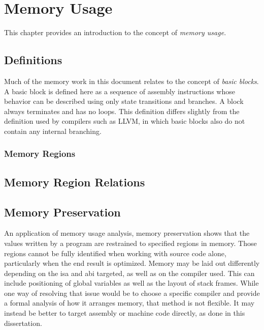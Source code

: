 \chapter{Memory Usage}\label{ch:memory}
This chapter provides an introduction to the concept of \emph{memory usage}.%


\section{Definitions}
Much of the memory work in this document relates to the concept of
\emph{basic blocks}.
A basic block is defined here as a sequence of assembly instructions
whose behavior can be described using only state transitions and branches.
A block always terminates and has no loops.
This definition differs slightly from the definition used by compilers such as LLVM,
in which basic blocks also do not contain any internal branching.

\subsection{Memory Regions}\label{memory_regions}
%



\section{Memory Region Relations}\label{mem_reg_rel}
%

\section{Memory Preservation}\label{se:memory_preservation}
An application of memory usage analysis,
memory preservation shows that the values written by a program%
are restrained to specified regions in memory.
Those regions cannot be fully identified when working with source code alone,
particularly when the end result is optimized.
Memory may be laid out differently depending on the \ac{isa} and \ac{abi} targeted,
as well as on the compiler used.
This can include positioning of global variables
as well as the layout of stack frames.
While one way of resolving that issue would be to choose a specific compiler
and provide a formal analysis of how it arranges memory, that method is not flexible.
It may instead be better to target assembly or machine code directly,
as done in this dissertation.

